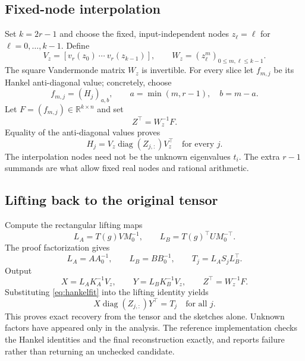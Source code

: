 \documentclass[11pt]{article}
\theoremstyle{remark}\newtheorem{remark}[theorem]{Remark}
\newcommand{\R}{\mathbb R}
\newcommand{\diag}{\operatorname{diag}}
\begin{document}
\subsection{Fixed-node interpolation}
Set $k=2r-1$ and choose the fixed, input-independent nodes $z_\ell=\ell$ for $\ell=0,\ldots,k-1$. Define
\[
 V_z=[v_r(z_0)\ \cdots\ v_r(z_{k-1})],\qquad
 W_z=(z_\ell^m)_{0\le m,\ell\le k-1}.
\]
The square Vandermonde matrix $W_z$ is invertible. For every slice let $f_{m,j}$ be its Hankel anti-diagonal value; concretely, choose
\[
 f_{m,j}=(H_j)_{a,b},\qquad a=\min(m,r-1),\quad b=m-a.
\]
Let $F=(f_{m,j})\in\R^{k\times n}$ and set
\begin{equation}\label{eq:zfactor}
 Z^\top=W_z^{-1}F.
\end{equation}
Equality of the anti-diagonal values proves
\begin{equation}\label{eq:hankelfit}
 H_j=V_z\diag(Z_{j,:})V_z^\top
 \quad\text{for every }j.
\end{equation}
The interpolation nodes need not be the unknown eigenvalues $t_i$. The extra $r-1$ summands are what allow fixed real nodes and rational arithmetic.

\subsection{Lifting back to the original tensor}
Compute the rectangular lifting maps
\begin{equation}\label{eq:lifts}
 L_A=T(g)V M_0^{-1},\qquad L_B=T(g)^\top U M_0^{-\top}.
\end{equation}
The proof factorization gives
\[
 L_A=AA_0^{-1},\qquad L_B=BB_0^{-1},\qquad
 T_j=L_AS_jL_B^\top.
\]
Output
\begin{equation}\label{eq:output}
 X=L_AK_A^{-1}V_z,\qquad
 Y=L_BK_B^{-1}V_z,\qquad
 Z^\top=W_z^{-1}F.
\end{equation}
Substituting \eqref{eq:hankelfit} into the lifting identity yields
\[
 X\diag(Z_{j,:})Y^\top=T_j
 \quad\text{for all }j.
\]
This proves exact recovery from the tensor and the sketches alone. Unknown factors have appeared only in the analysis. The reference implementation checks the Hankel identities and the final reconstruction exactly, and reports failure rather than returning an unchecked candidate.
\end{document}
